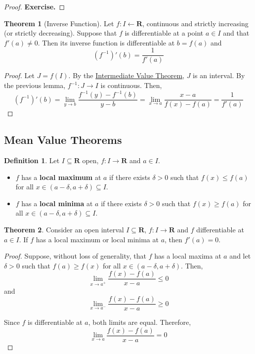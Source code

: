 \documentclass[tikz,12pt,a4paper]{article}
\theoremstyle{definition}
\newtheorem{theorem}{Theorem}[section]
\newtheorem{definition}{Definition}[section]
\begin{document}
\begin{proof}
	\textbf{Exercise.}
\end{proof}

\begin{theorem}[Inverse Function]
	Let $f : I \longleftarrow \textbf{R}$, continuous and strictly increasing (or strictly decreasing). Suppose that $f$ is differentiable at a point $a \in I$ and that $f'(a) \neq 0$. Then its inverse function is differentiable at $b = f(a)$ and
	\[
		(f^{-1})'(b) = \frac{1}{f'(a)}
	\]
\end{theorem}

\begin{proof}
	Let $J = f(I)$. By the \hyperref[thm:IVT]{Intermediate Value Theorem}, $J$ is an interval. By the previous lemma, $f^{-1} : J \longrightarrow I$ is continuous. Then,
	\[
		(f^{-1})'(b) = \lim_{y \to b} \frac{f^{-1}(y) - f^{-1}(b)}{y-b} = \lim_{x \to a} \frac{x - a}{f(x) - f(a)} = \frac{1}{f'(a)}
	\]
\end{proof}

\subsection{Mean Value Theorems}

\begin{definition}
	Let $I \subseteq \textbf{R}$ open, $f : I \longrightarrow \textbf{R}$ and $a \in I$.
	\begin{itemize}
		\item $f$ has a \textbf{local maximum} at $a$ if there exists $\delta > 0$ such that $f(x) \leq f(a)$ for all $x \in (a-\delta, a+\delta) \subseteq I$.
		\item $f$ has a \textbf{local minima} at $a$ if there exists $\delta > 0$ such that $f(x) \geq f(a)$ for all $x \in (a-\delta, a+\delta) \subseteq I$.
	\end{itemize}
\end{definition}

\begin{theorem}
	Consider an open interval $I \subseteq \textbf{R}$, $f : I \longrightarrow \textbf{R}$ and $f$ differentiable at $a \in I$. If $f$ has a local maximum or local minima at $a$, then $f'(a) = 0$.
\end{theorem}

\begin{proof}
	Suppose, without loss of generality, that $f$ has a local maxima at $a$ and let $\delta > 0$ such that $f(a) \geq f(x)$ for all $x \in (a-\delta, a+\delta)$. Then,
	\[
		\lim_{x \to a^{+}} \frac{f(x) - f(a)}{x-a} \leq 0
	\]
	and
	\[
		\lim_{x \to a^{-}} \frac{f(x) - f(a)}{x-a} \geq 0
	\]
	
	Since $f$ is differentiable at $a$, both limits are equal. Therefore,
	\[
		\lim_{x \to a} \frac{f(x) - f(a)}{x-a} = 0
	\]
\end{proof}
\end{document}
